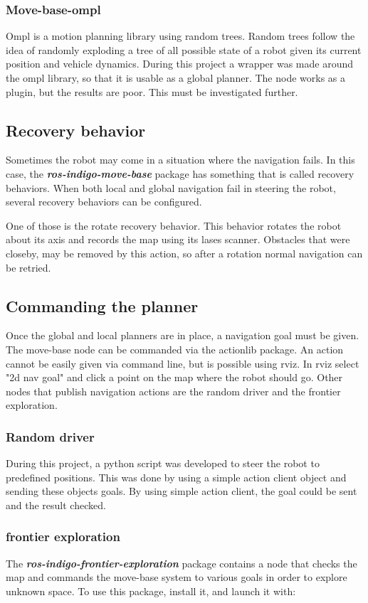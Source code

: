 \documentclass[a4paper]{article}
\newcommand{\rospackage}[1]{\textbf{\textit{ros-indigo-#1}}}
\begin{document}
\subsubsection{Move-base-ompl}
Ompl is a motion planning library using random trees.
Random trees follow the idea of randomly exploding a tree of all possible state of a robot
given its current position and vehicle dynamics.
During this project a wrapper was made around the ompl library, so that it
is usable as a global planner.
The node works as a plugin, but the results are poor. This must be investigated further.
\cite{globalompl}
\cite{ompl}

\subsection{Recovery behavior}
Sometimes the robot may come in a situation where the navigation fails. In this case, the 
\rospackage{move-base} package
has something that is called recovery behaviors. When both local and global navigation fail in
steering the robot, several recovery behaviors can be configured.

One of those is the rotate
recovery behavior. This behavior rotates the robot about its axis and records the map using its lases
scanner. Obstacles that were closeby, may be removed by this action, so after a rotation normal navigation
can be retried.

\subsection{Commanding the planner}
Once the global and local planners are in place, a navigation goal must be given.
The move-base node can be commanded via the actionlib package. An action
cannot be easily given via command line, but is possible using rviz.
In rviz select "2d nav goal" and click a point on the map where the robot should go.
Other nodes that publish navigation actions are the random driver and the frontier
exploration.

\subsubsection{Random driver}
During this project, a python script was developed to steer the robot to predefined positions.
This was done by using a simple action client object and sending these objects
goals. By using simple action client, the goal could be sent and the result checked.

\subsubsection{frontier exploration}
The \rospackage{frontier-exploration} package contains a node that checks the map and 
commands the move-base system to various goals in order to explore unknown space.
To use this package, install it, and launch it with:
\end{document}
